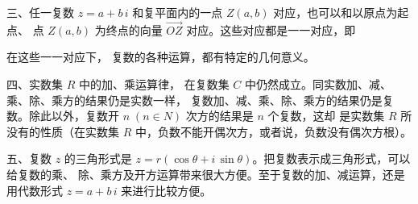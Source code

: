 三、任一复数 $z = a + b\,i$ 和复平面内的一点 $Z(a, b)$ 对应，也可以和以原点为起点、
点 $Z(a, b)$ 为终点的向量 $\overrightarrow{OZ}$ 对应。这些对应都是一一对应，即
\begin{figure}[htbp]
    \centering
    
\end{figure}

\hspace{-2em}在这些一一对应下， 复数的各种运算，都有特定的几何意义。

四、实数集 $R$ 中的加、乘运算律， 在复数集 $C$ 中仍然成立。同实数加、减、乘、除、乘方的结果仍是实数一样，
复数加、减、乘、除、乘方的结果仍是复数。除此以外，复数开 $n \; (n \in N)$ 次方的结果是 $n$ 个复数，这却
是实数集 $R$ 所没有的性质（在实数集 $R$ 中，负数不能开偶次方，或者说，负数没有偶次方根）。

五、复数 $z$ 的三角形式是 $z = r(\cos\theta + i\,\sin\theta)$。把复数表示成三角形式，可以给复数的乘、
除、乘方及开方运算带来很大方便。至于复数的加、减运算，还是用代数形式 $z = a + b\,i$ 来进行比较方便。



